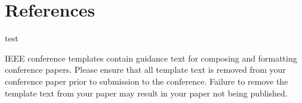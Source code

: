 \documentclass[conference]{IEEEtran}
\begin{document}
\section*{References}
test \cite{1389777}





\vspace{12pt}
\color{red}
IEEE conference templates contain guidance text for composing and formatting conference papers. Please ensure that all template text is removed from your conference paper prior to submission to the conference. Failure to remove the template text from your paper may result in your paper not being published.
\end{document}
